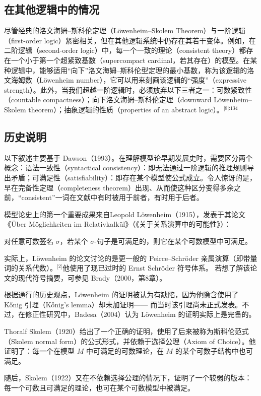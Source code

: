 \subsection{在其他逻辑中的情况}
尽管经典的洛文海姆–斯科伦定理（Löwenheim–Skolem Theorem）与一阶逻辑（first-order logic）紧密相关，但在其他逻辑系统中仍存在其若干变体。例如，在二阶逻辑（second-order logic）中，每一个一致的理论（consistent theory）都存在一个小于第一个超紧致基数（supercompact cardinal，若其存在）的模型。在某种逻辑中，能够适用“向下”洛文海姆–斯科伦型定理的最小基数，称为该逻辑的洛文海姆数（Löwenheim number），它可以用来刻画该逻辑的“强度”（expressive strength）。此外，当我们超越一阶逻辑时，必须放弃以下三者之一：可数紧致性（countable compactness）；向下洛文海姆–斯科伦定理（downward Löwenheim–Skolem theorem）；抽象逻辑的性质（properties of an abstract logic）。\(^\text{[8]:134 }\) 
\subsection{历史说明}
以下叙述主要基于 Dawson（1993）。在理解模型论早期发展史时，需要区分两个概念：语法一致性（syntactical consistency）：即无法通过一阶逻辑的推理规则导出矛盾；可满足性（satisfiability）：即存在某个模型使公式成立。令人惊讶的是，早在完备性定理（completeness theorem）出现、从而使这种区分变得多余之前，“consistent”一词在文献中有时被用于前者，有时用于后者。

模型论史上的第一个重要成果来自Leopold Löwenheim（1915），发表于其论文《Über Möglichkeiten im Relativkalkül》（《关于关系演算中的可能性》）：

对任意可数签名 \(\sigma\)，若某个 \(\sigma\)-句子是可满足的，则它在某个可数模型中可满足。

实际上，Löwenheim 的论文讨论的是更一般的 Peirce–Schröder 亲属演算（即带量词的关系代数）。\(^\text{[2]}\)他使用了现已过时的 Ernst Schröder 符号体系。  
若想了解该论文的现代符号摘要，可参见 Brady（2000，第8章）。

根据通行的历史观点，Löwenheim 的证明被认为有缺陷，因为他隐含使用了 Kőnig 引理（Kőnig’s lemma）却未加证明—— 而当时该引理尚未正式发表。不过，在修正性研究中，Badesa（2004）认为 Löwenheim 的证明实际上是完备的。

Thoralf Skolem（1920）给出了一个正确的证明，使用了后来被称为斯科伦范式（Skolem normal form）的公式形式，并依赖于选择公理（Axiom of Choice）。他证明了：每一个在模型 \(M\) 中可满足的可数理论，在 \(M\) 的某个可数子结构中也可满足。

随后，Skolem（1922）又在不依赖选择公理的情况下，证明了一个较弱的版本：每一个可数且可满足的理论，也可在某个可数模型中被满足。

